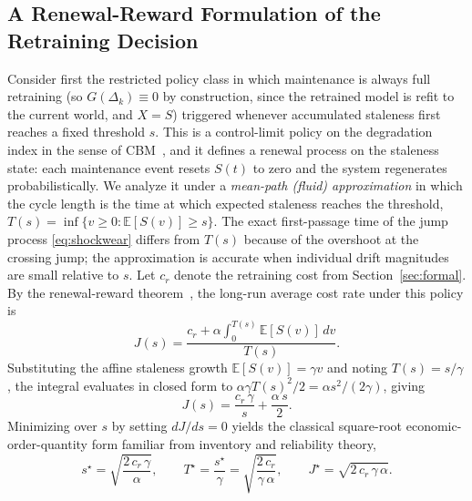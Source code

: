 \documentclass[electronics,article,submit,pdftex,moreauthors]{Definitions/mdpi}
\newcommand{\D}{\varDelta}                 %
\newcommand{\E}{\mathbb{E}}
\begin{document}
\subsection{A Renewal-Reward Formulation of the Retraining Decision}\label{sec:renewal}

Consider first the restricted policy class in which maintenance is always full retraining (so $G(\D_k)\equiv 0$ by construction, since the retrained model is refit to the current world, and $X=S$) triggered whenever accumulated staleness first reaches a fixed threshold $s$. This is a control-limit policy on the degradation index in the sense of CBM~\cite{Wang2002}, and it defines a renewal process on the staleness state: each maintenance event resets $S(t)$ to zero and the system regenerates probabilistically. We analyze it under a \textit{mean-path (fluid) approximation} in which the cycle length is the time at which expected staleness reaches the threshold, $T(s)=\inf\{v\ge 0:\E[S(v)]\ge s\}$. The exact first-passage time of the jump process \eqref{eq:shockwear} differs from $T(s)$ because of the overshoot at the crossing jump; the approximation is accurate when individual drift magnitudes are small relative to $s$. Let $c_r$ denote the retraining cost from Section~\ref{sec:formal}. By the renewal-reward theorem~\cite{Ross1996}, the long-run average cost rate under this policy is
\begin{equation}\label{eq:renewalcost}
J(s)=\frac{c_r+\alpha\int_0^{T(s)}\E[S(v)]\,dv}{T(s)}.
\end{equation}
Substituting the affine staleness growth $\E[S(v)]=\gamma v$ and noting $T(s)=s/\gamma$, the integral evaluates in closed form to $\alpha\gamma T(s)^2/2=\alpha s^2/(2\gamma)$, giving
\begin{equation}\label{eq:Js}
J(s)=\frac{c_r\,\gamma}{s}+\frac{\alpha\,s}{2}.
\end{equation}
Minimizing over $s$ by setting $dJ/ds=0$ yields the classical square-root economic-order-quantity form familiar from inventory and reliability theory,
\begin{equation}\label{eq:sqrt}
s^\star=\sqrt{\frac{2\,c_r\,\gamma}{\alpha}},\qquad
T^\star=\frac{s^\star}{\gamma}=\sqrt{\frac{2\,c_r}{\gamma\,\alpha}},\qquad
J^\star=\sqrt{2\,c_r\,\gamma\,\alpha}.
\end{equation}
\end{document}
